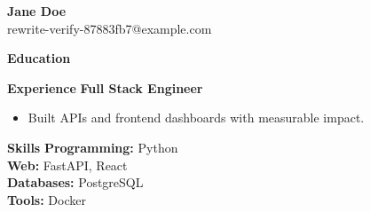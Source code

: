 \documentclass[10pt]{article}
\begin{document}
\begin{center}
    {\LARGE \textbf{Jane Doe}} \\
    rewrite-verify-87883fb7@example.com
\end{center}

\textbf{Education}

\textbf{Experience}
\textbf{Full Stack Engineer}
\begin{itemize}
\item Built APIs and frontend dashboards with measurable impact.
\end{itemize}

\textbf{Skills}
\textbf{Programming:} Python\\
\textbf{Web:} FastAPI, React\\
\textbf{Databases:} PostgreSQL\\
\textbf{Tools:} Docker\\
\end{document}
